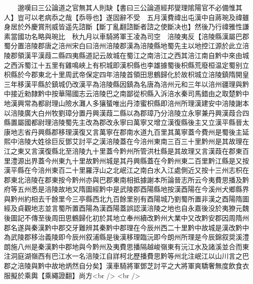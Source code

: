 　　邈嘆曰三公論道之官無其人則缺【書曰三公論道經邦燮理隂陽官不必備惟其人】豈可以老病忝之哉【忝辱也】遂固辭不受　五月漢費禕出屯漢中自蔣琬及禕雖身居於外慶賞刑威皆遥先諮斷【斷丁亂翻諮斷者諮之使斷决也】然後乃行禕雅性謙素當國功名略與琬比　秋九月以車騎將軍王凌為司空　涪陵夷反【涪陵縣漢屬巴郡蜀分置涪陵郡唐之涪州宋白曰涪州涪陵郡漢為涪陵縣地蜀先主以地控江源於此立涪陵郡領漢平漢葭二縣四夷縣道記云故城在蜀江之南涪江之西其涪江南自黔中來由城之西泝蜀江十五里有雞鳴峽上有枳城即漢枳縣也李雄據蜀後枳縣荒廢桓温定蜀别立枳縣於今郡東北十里周武帝保定四年涪陵首領田思鶴歸化於故枳城立涪陵鎮隋開皇三年移漢平縣於鎮城仍改漢平為涪陵縣因鎮為名唐為涪州元和三年以涪州疆理與黔中接近勑隸黔中按華陽國志云涪陵巴之南鄙從枳縣入泝涪水秦司馬錯由之取楚黔中地漢興常為都尉理山險水灘人多獽蜑唯出丹漆蜜枳縣即涪州所理漢建安中涪陵謝本以涪陵廣大白州牧劉璋分置丹興漢葭二縣以為郡璋乃分涪陵立永寧兼丹興漢葭合四縣置屬國都尉理涪陵蜀先主改為郡改永寧曰萬寧又增立漢復縣後主又立漢平縣晉太康地志省丹興縣郡移理漢復又言萬寧在郡南水道九百里其萬寧蓋今費州是蜀後主延熙中涪陵大姓徐巨反鄧艾討平之漢涪陵蓋在今涪州東南三百三十里黔州是其故理在江之東又言漢復縣北至涪陵九十里蓋今黔州所管洪杜縣是其故理又言漢葭在郡東百里澧源出界蓋今州東九十里故黔州城是其丹興縣蓋在今黔州東二百里黔江縣是又按漢平縣在今涪州東百二十里羅浮山之北岷江之南白水入江處側近又按十三州志枳在郡東北涪陵在郡東按今黔州亦與巴郡東南相抵據謝本所論晉志所云今夷費思播及黔府等五州悉是涪陵故地又隋圖經黔中是武陵郡酉陽縣地按漢酉陽在今溪州犬鄉縣界與黔州約相去千餘里今三亭縣西北九百餘里别有酉陽城乃劉蜀所置非漢之酉陽隋圖經及貞觀地志並言蜀所置酉陽為漢酉陽蓋誤認漢涪陵之地也自永嘉後没於夷獠元魏後圖記不傳至後周田思鶴歸化初於其地立奉州續改黔州大業中又改黔安郡因周隋州郡名遂與秦漢黔中郡交牙難辨其秦黔中郡理在今辰州西二十里黔中故城是漢改黔中為武陵郡移治義陵即今辰州叙浦縣是後漢移理臨沅即今朗州所理是今辰錦叙奨溪澧朗施八州是秦漢黔中郡地與今黔州及夷費思播隔越峻嶺東有沅江水及諸溪並合而東注洞庭湖嶺西有巴江水一名涪陵江自牂柯北歷播費思黔等州北注岷江以山川言之巴郡之涪陵與黔中故地炳然自分矣】漢車騎將軍鄧芝討平之大將軍爽驕奢無度飲食衣服擬於乘輿【乘繩證翻】尚方<br />
<br />
